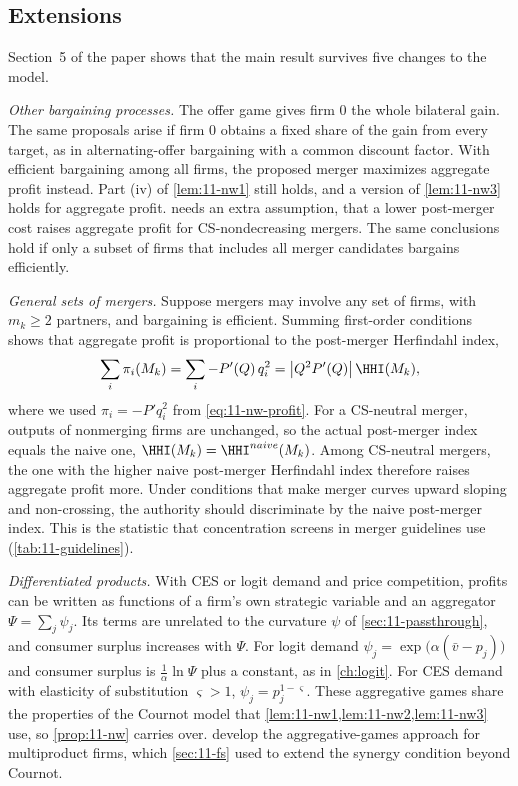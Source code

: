 \subsection{Extensions}\label{sec:11-nw-ext}

Section~5 of the paper shows that the main result survives five changes to the model.

\emph{Other bargaining processes.} The offer game gives firm 0 the whole bilateral gain. The same proposals arise if
firm 0 obtains a fixed share of the gain from every target, as in alternating-offer bargaining with a common discount
factor. With efficient bargaining among all firms, the proposed merger maximizes aggregate profit instead. Part (iv) of
\cref{lem:11-nw1} still holds, and a version of \cref{lem:11-nw3} holds for aggregate profit.  needs
an extra assumption, that a lower
post-merger cost raises aggregate profit for CS-nondecreasing mergers. The same conclusions hold if only a subset of
firms that includes all merger candidates bargains efficiently.

\emph{General sets of mergers.} Suppose mergers may involve any set of firms, with $m_k \ge 2$ partners, and bargaining is
efficient. Summing first-order conditions shows that aggregate profit is proportional to the post-merger Herfindahl
index,
\begin{equation}\label{eq:11-nw-aggprofit}
\sum_i \pi_i(M_k) = \sum_i -P'(Q)\,q_i^2 = \big|Q^2P'(Q)\big|\, \HHI(M_k),
\end{equation}
where we used $\pi_i = -P'q_i^2$ from \eqref{eq:11-nw-profit}. For a CS-neutral merger, outputs of nonmerging firms are
unchanged, so the actual post-merger index equals the naive one, $\HHI(M_k) = \HHI^{naive}(M_k)$. Among CS-neutral mergers,
the one with the higher naive post-merger Herfindahl index therefore raises aggregate profit more. Under conditions that
make merger curves upward sloping and non-crossing, the authority should discriminate by the naive post-merger index.
This is the statistic that concentration screens in merger guidelines use (\cref{tab:11-guidelines}).

\emph{Differentiated products.} With CES or logit demand and price competition, profits can be written as functions of
a firm's own strategic variable and an aggregator $\Psi = \sum_j\psi_j$. Its terms are unrelated to the curvature
$\psi$ of \cref{sec:11-passthrough}, and consumer surplus increases with $\Psi$.
For logit demand $\psi_j = \exp\big(\alpha(\bar v - p_j)\big)$ and consumer surplus is $\frac{1}{\alpha}\ln\Psi$ plus a
constant, as in \cref{ch:logit}. For CES demand with elasticity of substitution $\varsigma > 1$, $\psi_j = p_j^{1 - \varsigma}$.
These aggregative games share the properties of the Cournot model that \cref{lem:11-nw1,lem:11-nw2,lem:11-nw3} use,
so \cref{prop:11-nw} carries over. \citet{NockeSchutz2018} develop the aggregative-games approach for multiproduct
firms, which \cref{sec:11-fs} used to extend the synergy condition beyond Cournot.

